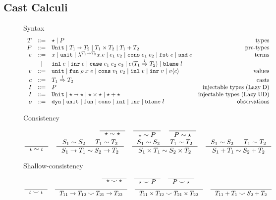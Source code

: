\documentclass[acmsmall,review,anonymous]{acmart}\settopmatter{printfolios=true,printccs=false,printacmref=false}
\newcommand{\stxrule}[3]{#1 & ::= & #3 & \text{#2}\\}
\newcommand{\stxrulecont}[1]{& | & #1 & \\}
\newcommand{\plus}[0]{+}
\newcommand{\lazyUD}{Lazy\;UD}
\newcommand{\lazyD}{Lazy\;D}
\newcommand{\POOunit}[0]{\mathtt{Unit}}
\newcommand{\POOfun}[2]{#1 \shortrightarrow #2}
\newcommand{\POOprod}[2]{#1 \times #2}
\newcommand{\POOsum}[2]{#1 \plus #2}
\newcommand{\eOOvar}[1]{#1}
\newcommand{\eOOsole}[0]{\mathtt{unit}}
\newcommand{\eOOlam}[4]{\lambda^{#1\rightarrow{}#2}#3.#4}
\newcommand{\eOOapp}[2]{#1 \; #2}
\newcommand{\eOOcons}[2]{\mathtt{cons} \; #1 \; #2}
\newcommand{\eOOcar}[1]{\mathtt{fst} \; #1}
\newcommand{\eOOcdr}[1]{\mathtt{snd} \; #1}
\newcommand{\eOOinl}[1]{\mathtt{inl} \; #1}
\newcommand{\eOOinr}[1]{\mathtt{inr} \; #1}
\newcommand{\eOOcase}[3]{\mathtt{case} \; #1 \; #2 \; #3}
\newcommand{\eOOcast}[4]{#1 \langle \cOOcast{#2}{#3}{#4} \rangle}
\newcommand{\eOOblame}[1]{\mathtt{blame} \; #1}
\newcommand{\cOOcast}[3]{#1 \overset{#2}{\Rightarrow} #3}
\newcommand{\oOOinj}{\mathtt{dyn}}
\newcommand{\oOOsole}{\mathtt{unit}}
\newcommand{\oOOfun}{\mathtt{fun}}
\newcommand{\oOOcons}{\mathtt{cons}}
\newcommand{\oOOinl}{\mathtt{inl}}
\newcommand{\oOOinr}{\mathtt{inr}}
\newcommand{\oOOblame}[1]{\mathtt{blame} \; #1}
\newcommand{\vOOcast}[2]{#1\langle#2\rangle}
\newcommand{\vOOfun}[3]{\mathtt{fun} \; #1 \; #2 \; #3}
\newcommand{\vOOtt}[0]{\mathtt{unit}}
\newcommand{\vOOcons}[2]{\mathtt{cons}\;#1\;#2}
\newcommand{\vOOinl}[1]{\mathtt{inl}\;#1}
\newcommand{\vOOinr}[1]{\mathtt{inr}\;#1}
\begin{document}
\subsection{Cast Calculi}
\label{sec:cast-calculi}
\begin{figure}
	Syntax
	\[
	\begin{array}{rclr}
	\stxrule{T}{types}{
		\star \mid{}
		P
	}
	\stxrule{P}{pre-types}{
		\POOunit \mid
		\POOfun{T_1}{T_2} \mid
		\POOprod{T_1}{T_2} \mid
		\POOsum{T_1}{T_2}
	}
	\stxrule{e}{terms}{
		\eOOvar{x} \mid{}
		\eOOsole{} \mid{}
		\eOOlam{T_1}{T_2}{x}{e} \mid
		\eOOapp{e_1}{e_2} \mid
		\eOOcons{e_1}{e_2} \mid
		\eOOcar{e} \mid
		\eOOcdr{e}
	}
	\stxrulecont{
		\eOOinl{e} \mid
		\eOOinr{e} \mid
		\eOOcase{e_1}{e_2}{e_3} \mid
		\eOOcast{e}{T_1}{l}{T_2} \mid
		\eOOblame{l}
	}
	\stxrule{v}{values}{
		\vOOtt{} \mid
		\vOOfun{\rho}{x}{e} \mid
		\vOOcons{v_1}{v_2} \mid
		\vOOinl{v} \mid
		\vOOinr{v} \mid		
		\vOOcast{v}{c}
	}
	\stxrule{c}{casts}{
		\cOOcast{T_1}{l}{T_2}
	}
	\stxrule{I}{injectable types (\lazyD)}{
		P
	}
	\stxrule{I}{injectable types (\lazyUD)}{
		\POOunit \mid
		\POOfun{\star}{\star} \mid
		\star \times \star \mid
		\star + \star
	}
	\stxrule{o}{observations}{
		\oOOinj \mid
		\oOOsole \mid
		\oOOfun \mid
		\oOOcons \mid
		\oOOinl \mid
		\oOOinr \mid
		\oOOblame{l}
	}
	\end{array}
	\]
	
	Consistency
	\begin{gather*}
	\inference{}{
		\star \sim \star
	} \quad
	\inference{}{
		\star \sim P
	} \quad
	\inference{}{
		P \sim \star
	} \\
	\inference{}{
		\iota \sim \iota
	} \quad
	\inference{
		S_1 \sim S_2 &
		T_1 \sim T_2
	}{
		S_1 \rightarrow T_1 \sim S_2 \rightarrow T_2
	} \quad
	\inference{
		S_1 \sim S_2 &
		T_1 \sim T_2
	}{
		S_1 \times T_1 \sim S_2 \times T_2
	} \quad
	\inference{
		S_1 \sim S_2 &
		T_1 \sim T_2
	}{
		S_1 \plus T_1 \sim S_2 \plus T_2
	}
	\end{gather*}
	
	Shallow-consistency
	\begin{gather*}
	\inference{}{
		\star \smile \star
	} \quad
	\inference{}{
		\star \smile P
	} \quad
	\inference{}{
		P \smile \star
	} \\
	\inference{}{
		\iota \smile \iota
	} \quad
	\inference{}{
		T_{11} \rightarrow T_{12} \smile T_{21} \rightarrow T_{22}
	} \quad
	\inference{}{
		T_{11} \times T_{12} \smile T_{21} \times T_{22}
	} \quad
	\inference{}{
	T_{11} \plus T_1 \smile S_2 \plus T_2
	}
	\end{gather*}
	

\end{figure}
\end{document}
